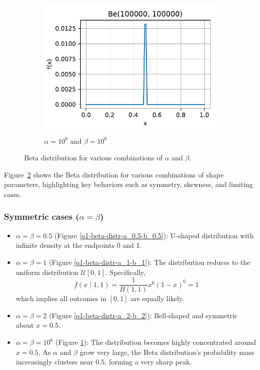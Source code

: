 \begin{figure}[H]
\begin{subfigure}{0.3\textwidth}
        \centering
        \includegraphics[width=1\textwidth]{resources/figures/q1-beta_distr-alpha_100000-beta_100000.pdf}
        \caption{$\alpha = 10^6$ and $\beta = 10^6$}
        \label{q1-beta-distr-a_10e6-b_10e6}
    \end{subfigure}
    \caption{Beta distribution for various combinations of $\alpha$ and $\beta$.}
    \label{fig:q1-beta-distr}
\end{figure}



Figure~\ref{fig:q1-beta-distr} shows the Beta distribution for various combinations of shape parameters, highlighting key behaviors such as symmetry, skewness, and limiting cases.

\subsubsection*{Symmetric cases ($\alpha = \beta$)}
\begin{itemize}
    \item $\alpha = \beta = 0.5$ (Figure \ref{q1-beta-distr-a_0.5-b_0.5}): U-shaped distribution with infinite density at the endpoints 0 and 1.
    \item $\alpha = \beta = 1$ (Figure \ref{q1-beta-distr-a_1-b_1}): The distribution reduces to the uniform distribution $\mathcal{U}[0, 1]$. Specifically,
    \[
    f(x \mid 1, 1) = \frac{1}{B(1, 1)} x^{0}(1 - x)^{0} = 1
    \]
    which implies all outcomes in $[0, 1]$ are equally likely.
    \item $\alpha = \beta = 2$ (Figure \ref{q1-beta-distr-a_2-b_2}): Bell-shaped and symmetric about $x = 0.5$.
    \item $\alpha = \beta = 10^6$  (Figure \ref{q1-beta-distr-a_10e6-b_10e6}): The distribution becomes highly concentrated around $x = 0.5$. As $\alpha$ and $\beta$ grow very large, the Beta distribution's probability mass increasingly clusters near $0.5$, forming a very sharp peak.
\end{itemize}

